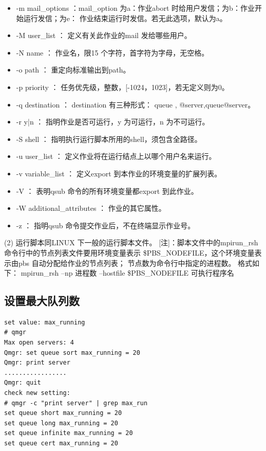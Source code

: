 {\begin{itemize}
\begin{itemize}
	\item nodes=N:ppn=M ：请求N 个结点，每个结点M 个处理器。
	\end{itemize}

\item -m mail\_options ：mail\_option 为a：作业abort 时给用户发信；为b：作业开始运行发信；为e：
作业结束运行时发信。若无此选项，默认为a。

\item -M user\_list ： 定义有关此作业的mail 发给哪些用户。

\item -N name ： 作业名，限15 个字符，首字符为字母，无空格。

\item -o path ： 重定向标准输出到path。

\item -p priority ： 任务优先级，整数，[-1024，1023]，若无定义则为0。

\item -q destination ： destination 有三种形式： queue , @server,queue@server。

\item -r y|n ： 指明作业是否可运行，y 为可运行，n 为不可运行。

\item -S shell ： 指明执行运行脚本所用的shell，须包含全路径。

\item -u user\_list ： 定义作业将在运行结点上以哪个用户名来运行。

\item -v variable\_list ： 定义export 到本作业的环境变量的扩展列表。

\item -V ： 表明qsub 命令的所有环境变量都export 到此作业。

\item -W additional\_attributes ： 作业的其它属性。

\item -z ： 指明qsub 命令提交作业后，不在终端显示作业号。
\end{itemize}


(2) 运行脚本同LINUX 下一般的运行脚本文件。
[注]：脚本文件中的mpirun\_rsh 命令行中的节点列表文件要用环境变量表示
\$PBS\_NODEFILE，这个环境变量表示由pbs 自动分配给作业的节点列表；
节点数为命令行中指定的进程数。
格式如下：
mpirun\_rsh –np 进程数 –hostfile \$PBS\_NODEFILE 可执行程序名



\subsection{设置最大队列数}
\begin{verbatim}
set value: max_running
# qmgr
Max open servers: 4
Qmgr: set queue sort max_running = 20
Qmgr: print server
.................
Qmgr: quit
check new setting:
# qmgr -c "print server" | grep max_run
set queue short max_running = 20
set queue long max_running = 20
set queue infinite max_running = 20
set queue cert max_running = 20
\end{verbatim}

}
